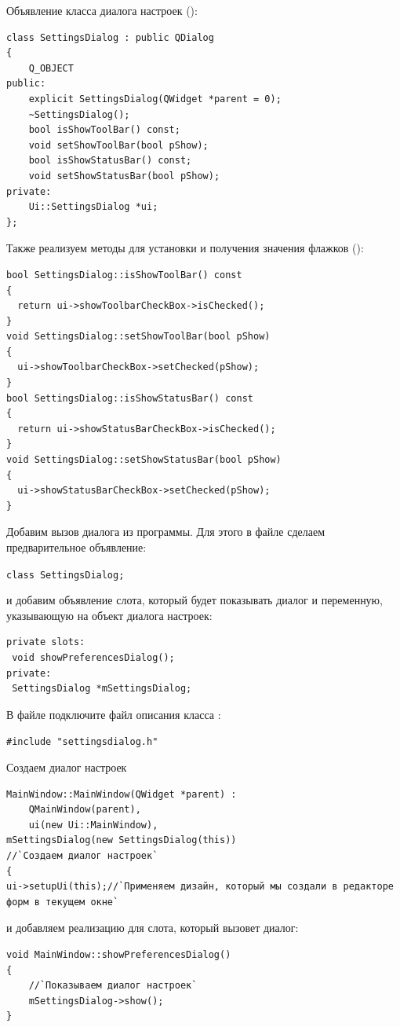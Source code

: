 Объявление класса диалога настроек ():
\begin{lstlisting}
class SettingsDialog : public QDialog
{
    Q_OBJECT
public:
    explicit SettingsDialog(QWidget *parent = 0);
    ~SettingsDialog();
    bool isShowToolBar() const;
    void setShowToolBar(bool pShow);
    bool isShowStatusBar() const;
    void setShowStatusBar(bool pShow);
private:
    Ui::SettingsDialog *ui;
};
\end{lstlisting}


Также реализуем методы для установки и получения значения флажков ():
\begin{lstlisting}
bool SettingsDialog::isShowToolBar() const
{
  return ui->showToolbarCheckBox->isChecked();
}
void SettingsDialog::setShowToolBar(bool pShow)
{
  ui->showToolbarCheckBox->setChecked(pShow);
}
bool SettingsDialog::isShowStatusBar() const
{
  return ui->showStatusBarCheckBox->isChecked();
}
void SettingsDialog::setShowStatusBar(bool pShow)
{
  ui->showStatusBarCheckBox->setChecked(pShow);
}
\end{lstlisting}


Добавим вызов диалога из программы. Для этого в файле  сделаем предварительное объявление:

\lstinline!class SettingsDialog;!

и добавим объявление слота, который будет показывать диалог и переменную, указывающую на объект диалога настроек: 
\begin{lstlisting}
private slots:
 void showPreferencesDialog();
private:
 SettingsDialog *mSettingsDialog;
\end{lstlisting}

В файле  подключите файл описания класса : 

\lstinline!#include "settingsdialog.h"!

Создаем диалог настроек 
\begin{lstlisting}
MainWindow::MainWindow(QWidget *parent) :
    QMainWindow(parent),
    ui(new Ui::MainWindow),
mSettingsDialog(new SettingsDialog(this))
//`Создаем диалог настроек`
{
ui->setupUi(this);//`Применяем дизайн, который мы создали в редакторе форм в текущем окне`
\end{lstlisting}

и добавляем реализацию для слота, который вызовет диалог: 

\begin{lstlisting}
void MainWindow::showPreferencesDialog()
{
    //`Показываем диалог настроек`
    mSettingsDialog->show();
}
\end{lstlisting}

